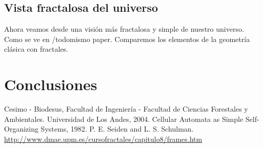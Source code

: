 \documentclass[12tp]{article}
\begin{document}
\subsection{Vista fractalosa del universo}

Ahora veamos desde una visión más fractalosa y simple de nuestro universo. Como se ve en /todo{mismo paper}. Comparemos los elementos
de la geometría clásica con fractales.

\section{Conclusiones}

\begin{small}
\begin{thebibliography}{1}
 Cesimo - Biodesus, Facultad de Ingeniería - Facultad de Ciencias Forestales y Ambientales. Universidad de Los Andes, 2004.
 Cellular Automata as Simple Self-Organizing Systems, 1982.
 P. E. Seiden and L. S. Schulman.
\url{http://www.dmae.upm.es/cursofractales/capitulo8/frames.htm}
\end{thebibliography}
\end{small}
\end{document}
